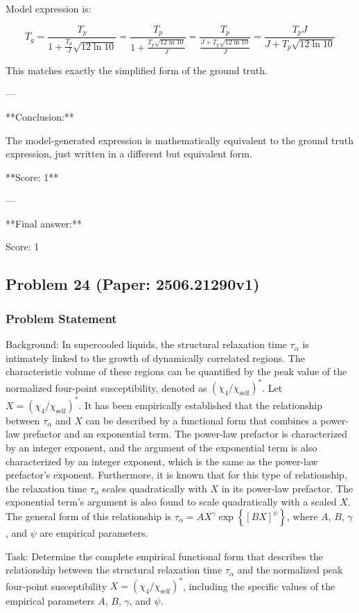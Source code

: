 \documentclass[10pt]{article}
\begin{document}
Model expression is:

\[
T_g = \frac{T_p}{1 + \frac{T_p}{J} \sqrt{12 \ln 10}} = \frac{T_p}{1 + \frac{T_p \sqrt{12 \ln 10}}{J}} = \frac{T_p}{\frac{J + T_p \sqrt{12 \ln 10}}{J}} = \frac{T_p J}{J + T_p \sqrt{12 \ln 10}}
\]

This matches exactly the simplified form of the ground truth.

---

**Conclusion:**

The model-generated expression is mathematically equivalent to the ground truth expression, just written in a different but equivalent form.

**Score: 1**

---

**Final answer:**

Score: 1

\newpage
\subsection*{Problem 24 (Paper: 2506.21290v1)}
\subsubsection*{Problem Statement}
Background:
In supercooled liquids, the structural relaxation time $\tau_\alpha$ is intimately linked to the growth of dynamically correlated regions. The characteristic volume of these regions can be quantified by the peak value of the normalized four-point susceptibility, denoted as $(\chi_4/\chi_{\text{self}})^*$. Let $X = (\chi_4/\chi_{\text{self}})^*$. It has been empirically established that the relationship between $\tau_\alpha$ and $X$ can be described by a functional form that combines a power-law prefactor and an exponential term. The power-law prefactor is characterized by an integer exponent, and the argument of the exponential term is also characterized by an integer exponent, which is the same as the power-law prefactor's exponent. Furthermore, it is known that for this type of relationship, the relaxation time $\tau_\alpha$ scales quadratically with $X$ in its power-law prefactor. The exponential term's argument is also found to scale quadratically with a scaled $X$. The general form of this relationship is $\tau_{\alpha} = A X^{\gamma} \exp\left\{ \left[ B X \right]^{\psi} \right\}$, where $A$, $B$, $\gamma$, and $\psi$ are empirical parameters.

Task:
Determine the complete empirical functional form that describes the relationship between the structural relaxation time $\tau_\alpha$ and the normalized peak four-point susceptibility $X = (\chi_4/\chi_{\text{self}})^*$, including the specific values of the empirical parameters $A$, $B$, $\gamma$, and $\psi$.
\end{document}
